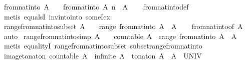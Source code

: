\begin{isabellebody}
\endisatagproof
{\isafoldproof}%
%
\isadelimproof
\isanewline
%
\endisadelimproof
\isanewline
{}\isamarkupfalse%
\ from{\isacharunderscore}nat{\isacharunderscore}into{\isacharcolon}\ {\isachardoublequoteopen}A\ {\isasymnoteq}\ {\isacharbraceleft}{\isacharbraceright}\ {\isasymLongrightarrow}\ from{\isacharunderscore}nat{\isacharunderscore}into\ A\ n\ {\isasymin}\ A{\isachardoublequoteclose}\isanewline
%
\isadelimproof
\ \ %
\endisadelimproof
%
\isatagproof
{}\isamarkupfalse%
\ from{\isacharunderscore}nat{\isacharunderscore}into{\isacharunderscore}def\ \isamarkupfalse%
\ {\isacharparenleft}metis\ equals{}I\ inv{\isacharunderscore}into{\isacharunderscore}into\ someI{\isacharunderscore}ex{\isacharparenright}%
\endisatagproof
{\isafoldproof}%
%
\isadelimproof
\isanewline
%
\endisadelimproof
\isanewline
{}\isamarkupfalse%
\ range{\isacharunderscore}from{\isacharunderscore}nat{\isacharunderscore}into{\isacharunderscore}subset{\isacharcolon}\ {\isachardoublequoteopen}A\ {\isasymnoteq}\ {\isacharbraceleft}{\isacharbraceright}\ {\isasymLongrightarrow}\ range\ {\isacharparenleft}from{\isacharunderscore}nat{\isacharunderscore}into\ A{\isacharparenright}\ {\isasymsubseteq}\ A{\isachardoublequoteclose}\isanewline
%
\isadelimproof
\ \ %
\endisadelimproof
%
\isatagproof
{}\isamarkupfalse%
\ from{\isacharunderscore}nat{\isacharunderscore}into{\isacharbrackleft}of\ A{\isacharbrackright}\ \isamarkupfalse%
\ auto%
\endisatagproof
{\isafoldproof}%
%
\isadelimproof
\isanewline
%
\endisadelimproof
\isanewline
{}\isamarkupfalse%
\ range{\isacharunderscore}from{\isacharunderscore}nat{\isacharunderscore}into{\isacharbrackleft}simp{\isacharbrackright}{\isacharcolon}\ {\isachardoublequoteopen}A\ {\isasymnoteq}\ {\isacharbraceleft}{\isacharbraceright}\ {\isasymLongrightarrow}\ countable\ A\ {\isasymLongrightarrow}\ range\ {\isacharparenleft}from{\isacharunderscore}nat{\isacharunderscore}into\ A{\isacharparenright}\ {\isacharequal}\ A{\isachardoublequoteclose}\isanewline
%
\isadelimproof
\ \ %
\endisadelimproof
%
\isatagproof
{}\isamarkupfalse%
\ {\isacharparenleft}metis\ equalityI\ range{\isacharunderscore}from{\isacharunderscore}nat{\isacharunderscore}into{\isacharunderscore}subset\ subset{\isacharunderscore}range{\isacharunderscore}from{\isacharunderscore}nat{\isacharunderscore}into{\isacharparenright}%
\endisatagproof
{\isafoldproof}%
%
\isadelimproof
\isanewline
%
\endisadelimproof
\isanewline
{}\isamarkupfalse%
\ image{\isacharunderscore}to{\isacharunderscore}nat{\isacharunderscore}on{\isacharcolon}\ {\isachardoublequoteopen}countable\ A\ {\isasymLongrightarrow}\ infinite\ A\ {\isasymLongrightarrow}\ to{\isacharunderscore}nat{\isacharunderscore}on\ A\ {\isacharbackquote}\ A\ {\isacharequal}\ UNIV{\isachardoublequoteclose}\isanewline

\end{isabellebody}
